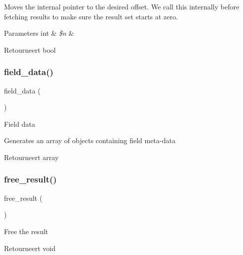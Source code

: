 Moves the internal pointer to the desired offset. We call this internally before fetching results to make sure the result set starts at zero.


\begin{DoxyParams}[1]{Parameters}
int & {\em \$n} & \\
\hline
\end{DoxyParams}
\begin{DoxyReturn}{Retourneert}
bool 
\end{DoxyReturn}
\mbox{\label{class_c_i___d_b__mysql__result_a84bffd65e53902ade1591716749a33e3}} 
\subsubsection{\texorpdfstring{field\_data()}{field\_data()}}
{\footnotesize\ttfamily field\+\_\+data (\begin{DoxyParamCaption}{ }\end{DoxyParamCaption})}

Field data

Generates an array of objects containing field meta-\/data

\begin{DoxyReturn}{Retourneert}
array 
\end{DoxyReturn}
\mbox{\label{class_c_i___d_b__mysql__result_aad2d98d6beb3d6095405356c6107b473}} 
\subsubsection{\texorpdfstring{free\_result()}{free\_result()}}
{\footnotesize\ttfamily free\+\_\+result (\begin{DoxyParamCaption}{ }\end{DoxyParamCaption})}

Free the result

\begin{DoxyReturn}{Retourneert}
void 
\end{DoxyReturn}
\mbox{\label{class_c_i___d_b__mysql__result_a50b54eb4ea7cfd039740f532988ea776}} 
